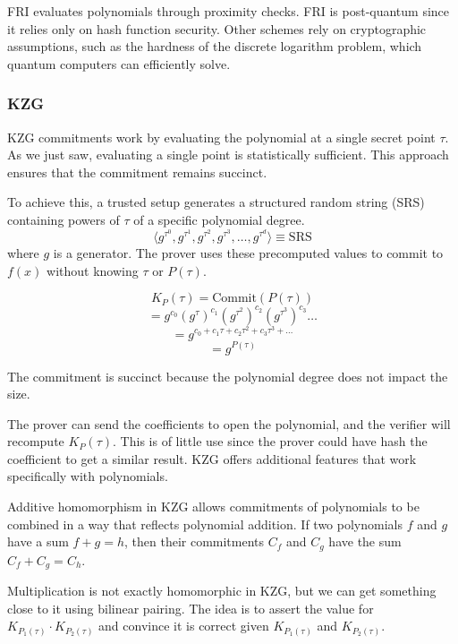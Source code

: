 FRI evaluates polynomials through proximity checks.\cite{FRI} FRI is post-quantum since it relies only on hash function security. 
Other schemes rely on cryptographic assumptions, such as the hardness of the discrete logarithm problem, which quantum computers can efficiently solve.


\subsubsection{KZG}
KZG commitments work by evaluating the polynomial at a single secret point $\tau$. 
As we just saw, evaluating a single point is statistically sufficient.
This approach ensures that the commitment remains succinct.

To achieve this, a trusted setup generates a structured random string (SRS) containing powers of $\tau$
of a specific polynomial degree. 
\[
\langle g^{\tau^0}, g^{\tau^1}, g^{\tau^2}, g^{\tau^3}, \dots, g^{\tau^d} \rangle \equiv \text{SRS}
\]
where \( g \) is a generator.  
The prover uses these precomputed values to commit to \( f(x) \) without knowing \( \tau \) or \( P(\tau) \).

\begin{equation*}
 K_P(\tau) = \text{Commit}(P(\tau))
\end{equation*}
\begin{equation*}
 = g^{c_0} (g^\tau)^{c_1} (g^{\tau^2})^{c_2} (g^{\tau^3})^{c_3} \dots
\end{equation*}
\begin{equation*}
 = g^{c_0 + c_1 \tau + c_2 \tau^2 + c_3 \tau^3 + \dots}
\end{equation*}
\begin{equation*}
 = g^{P(\tau)}
\end{equation*}

The commitment is succinct because the polynomial degree does not impact the size.


The prover can send the coefficients to open the polynomial, and the verifier will recompute $K_P(\tau)$.
This is of little use since the prover could have hash the coefficient to get a similar result.
KZG offers additional features that work specifically with polynomials.

Additive homomorphism in KZG allows commitments of polynomials to be combined in a way that reflects polynomial addition. 
If two polynomials $f$ and $g$ have a sum $f + g = h$, then their commitments $C_f$ and $C_g$ have the sum $C_f + C_g = C_h$.

Multiplication is not exactly homomorphic in KZG, but we can get something close to it using bilinear pairing.
The idea is to assert the value for $K_{P_1(\tau)} \cdot K_{P_2(\tau)}$ and convince it is correct given $K_{P_1(\tau)}$ and $K_{P_2(\tau)}$.

